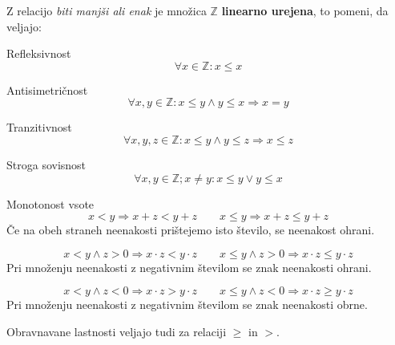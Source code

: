         \begin{frame}
            \begin{alertblock}{}
                Z relacijo \textit{biti manjši ali enak} je množica $\mathbb{Z}$ \textbf{linearno urejena}, 
                to pomeni, da veljajo:
            \end{alertblock}
            
            \begin{block}{Refleksivnost}
                $$\forall x\in\mathbb{Z}: x\leq x$$
            \end{block}

            \begin{block}{Antisimetričnost}
                $$\forall x,y\in\mathbb{Z}: x\leq y \land y\leq x \Rightarrow x=y$$
            \end{block}

            \begin{block}{Tranzitivnost}
                $$\forall x,y,z\in\mathbb{Z}: x\leq y \land y\leq z \Rightarrow x\leq z$$
            \end{block}

            \begin{block}{Stroga sovisnost}
                $$\forall x,y\in\mathbb{Z}; x\neq y: x\leq y \lor y\leq x$$

            \end{block}

        \end{frame}

        \begin{frame}
            \begin{block}{Monotonost vsote}
                $$x<y \Rightarrow x+z<y+z \quad \quad x\leq y \Rightarrow x+z\leq y+z$$
                Če na obeh straneh neenakosti prištejemo isto število, se neenakost ohrani.
            \end{block}

            \begin{block}{}
                $$x<y \land z>0 \Rightarrow x\cdot z<y\cdot z \quad \quad x\leq y \land z>0 \Rightarrow x\cdot z\leq y\cdot z$$
                Pri množenju neenakosti z negativnim številom se znak neenakosti ohrani.
            \end{block}

            \begin{block}{}
                $$x<y \land z<0 \Rightarrow x\cdot z>y\cdot z \quad \quad x\leq y \land z<0 \Rightarrow x\cdot z\geq y\cdot z$$
                Pri množenju neenakosti z negativnim številom se znak neenakosti obrne.
            \end{block}

            \begin{block}{}
                Obravnavane lastnosti veljajo tudi za relaciji $\geq$ in $>$.
            \end{block}

        \end{frame}

